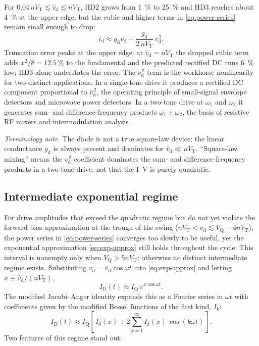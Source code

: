 \documentclass[12pt]{article}
\newcommand{\ID}{I_{\mathrm{D}}}
\newcommand{\VT}{V_{\mathrm{T}}}
\newcommand{\VQ}{V_{\mathrm{Q}}}
\newcommand{\IQ}{I_{\mathrm{Q}}}
\newcommand{\vd}{v_{\mathrm{d}}}
\newcommand{\id}{i_{\mathrm{d}}}
\newcommand{\gd}{g_{\mathrm{d}}}
\newcommand{\vhd}{\hat{v}_{\mathrm{d}}}
\newcommand{\eu}{\mathrm{e}}        %
\begin{document}
For $0.04\, n\VT \lesssim \vhd \lesssim n\VT$, HD2 grows from \SI{1}{\percent} to \SI{25}{\percent} and HD3 reaches about \SI{4}{\percent} at the upper edge, but the cubic and higher terms in \eqref{eq:power-series} remain small enough to drop:
\begin{equation}
\id \approx \gd \vd + \frac{\gd}{2\, n \VT}\, \vd^{\,2}.
\label{eq:quadratic}
\end{equation}
Truncation error peaks at the upper edge: at $\vhd = n\VT$ the dropped cubic term adds $x^2/8 = \SI{12.5}{\percent}$ to the fundamental and the predicted rectified DC runs \SI{6}{\percent} low; HD3 alone understates the error. The $\vd^{\,2}$ term is the workhorse nonlinearity for two distinct applications. In a single-tone drive it produces a rectified DC component proportional to $\vhd^{\,2}$, the operating principle of small-signal envelope detectors and microwave power detectors. In a two-tone drive at $\omega_1$ and $\omega_2$ it generates sum- and difference-frequency products $\omega_1 \pm \omega_2$, the basis of resistive RF mixers and intermodulation analysis \cite{maas,pozar}.

\emph{Terminology note.} The diode is not a true square-law device: the linear conductance $\gd$ is always present and dominates for $\vhd \ll n\VT$. ``Square-law mixing'' means the $\vd^{\,2}$ coefficient dominates the sum- and difference-frequency products in a two-tone drive, not that the I--V is purely quadratic.

\subsection*{Intermediate exponential regime}

For drive amplitudes that exceed the quadratic regime but do not yet violate the forward-bias approximation at the trough of the swing ($n \VT < \vhd \lesssim \VQ - 4n\VT$), the power series in \eqref{eq:power-series} converges too slowly to be useful, yet the exponential approximation \eqref{eq:exp-approx} still holds throughout the cycle. This interval is nonempty only when $\VQ > 5n\VT$; otherwise no distinct intermediate regime exists. Substituting $\vd = \vhd \cos\omega t$ into \eqref{eq:exp-approx} and letting $x \equiv \vhd / (n \VT)$,
\begin{equation}
\ID(t) \approx \IQ\, \eu^{\,x \cos\omega t}.
\end{equation}
The modified Jacobi--Anger identity expands this as a Fourier series in $\omega t$ with coefficients given by the modified Bessel functions of the first kind, $I_k$:
\begin{equation}
\ID(t) \approx \IQ \left[\, I_0(x) + 2 \sum_{k=1}^{\infty} I_k(x)\, \cos(k \omega t) \,\right].
\label{eq:bessel-expansion}
\end{equation}
Two features of this regime stand out:
\end{document}
